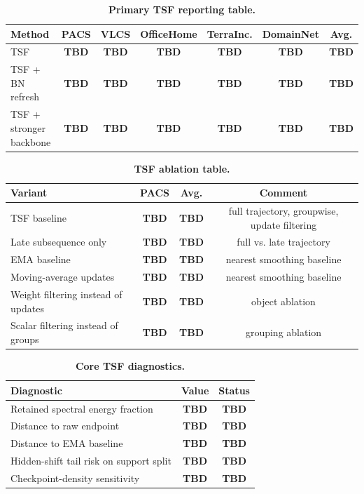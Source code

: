 \documentclass{article}
\newcommand{\tsf}{\textup{\textsc{TSF}}}
\newcommand{\TBD}{\textbf{TBD}}
\begin{document}
\begin{table}[t]
    \centering
    \small
    \caption{\textbf{Primary \tsf{} reporting table.}}
    \label{tab:tsf_main}
    \setlength{\tabcolsep}{6pt}
    \begin{tabular}{lcccccc}
        \toprule
        Method & PACS & VLCS & OfficeHome & TerraInc. & DomainNet & Avg. \\
        \midrule
        \tsf{} & \TBD & \TBD & \TBD & \TBD & \TBD & \TBD \\
        \tsf{} + BN refresh & \TBD & \TBD & \TBD & \TBD & \TBD & \TBD \\
        \tsf{} + stronger backbone & \TBD & \TBD & \TBD & \TBD & \TBD & \TBD \\
        \bottomrule
    \end{tabular}
\end{table}

\begin{table}[t]
    \centering
    \small
    \caption{\textbf{\tsf{} ablation table.}}
    \label{tab:tsf_ablation}
    \setlength{\tabcolsep}{7pt}
    \begin{tabular}{lccc}
        \toprule
        Variant & PACS & Avg. & Comment \\
        \midrule
        \tsf{} baseline & \TBD & \TBD & full trajectory, groupwise, update filtering \\
        Late subsequence only & \TBD & \TBD & full vs. late trajectory \\
        EMA baseline & \TBD & \TBD & nearest smoothing baseline \\
        Moving-average updates & \TBD & \TBD & nearest smoothing baseline \\
        Weight filtering instead of updates & \TBD & \TBD & object ablation \\
        Scalar filtering instead of groups & \TBD & \TBD & grouping ablation \\
        \bottomrule
    \end{tabular}
\end{table}

\begin{table}[t]
    \centering
    \small
    \caption{\textbf{Core \tsf{} diagnostics.}}
    \label{tab:tsf_diagnostics}
    \begin{tabular}{lcc}
        \toprule
        Diagnostic & Value & Status \\
        \midrule
        Retained spectral energy fraction & \TBD & \TBD \\
        Distance to raw endpoint & \TBD & \TBD \\
        Distance to EMA baseline & \TBD & \TBD \\
        Hidden-shift tail risk on support split & \TBD & \TBD \\
        Checkpoint-density sensitivity & \TBD & \TBD \\
        \bottomrule
    \end{tabular}
\end{table}
\end{document}
